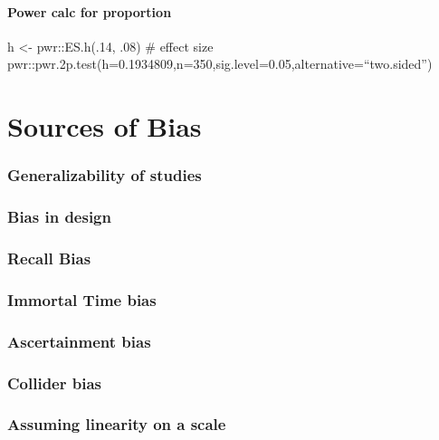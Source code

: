 \documentclass[
]{book}
\begin{document}
\hypertarget{power-calc-for-proportion}{%
\subsubsection{Power calc for proportion}\label{power-calc-for-proportion}}

h \textless- pwr::ES.h(.14, .08) \# effect size
pwr::pwr.2p.test(h=0.1934809,n=350,sig.level=0.05,alternative=``two.sided'')

\hypertarget{sources-of-bias}{%
\chapter{Sources of Bias}\label{sources-of-bias}}

\hypertarget{generalizability-of-studies}{%
\subsection{Generalizability of studies}\label{generalizability-of-studies}}

\hypertarget{bias-in-design}{%
\subsection{Bias in design}\label{bias-in-design}}

\hypertarget{recall-bias}{%
\subsection{Recall Bias}\label{recall-bias}}

\hypertarget{immortal-time-bias}{%
\subsection{Immortal Time bias}\label{immortal-time-bias}}

\hypertarget{ascertainment-bias}{%
\subsection{Ascertainment bias}\label{ascertainment-bias}}

\hypertarget{collider-bias}{%
\subsection{Collider bias}\label{collider-bias}}

\hypertarget{assuming-linearity-on-a-scale}{%
\subsection{Assuming linearity on a scale}\label{assuming-linearity-on-a-scale}}
\end{document}
